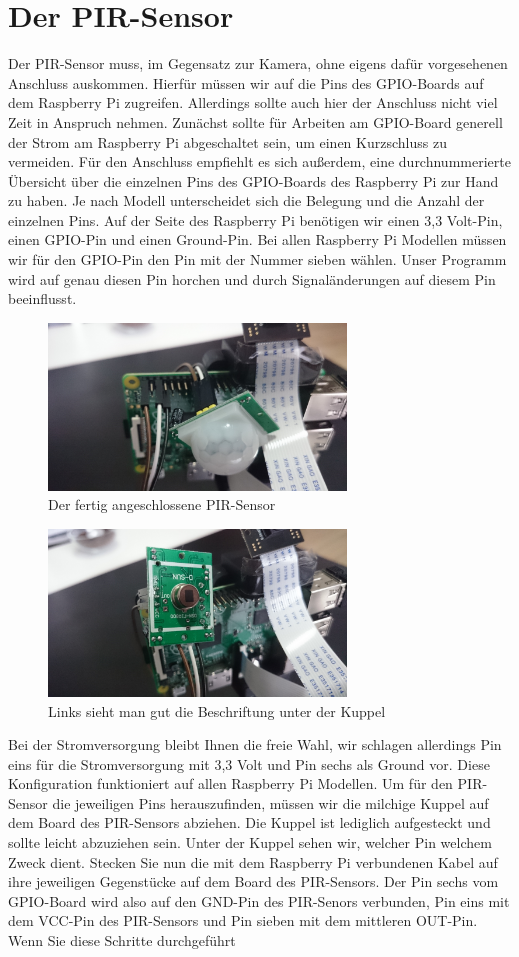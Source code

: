 \documentclass[12pt,a4paper]{scrreprt}
\begin{document}
\section{Der PIR-Sensor}
Der PIR-Sensor muss, im Gegensatz zur Kamera, ohne eigens dafür vorgesehenen Anschluss auskommen. Hierfür müssen wir auf die Pins des GPIO-Boards auf dem Raspberry Pi zugreifen. Allerdings sollte auch hier der Anschluss nicht viel Zeit in Anspruch nehmen. Zunächst sollte für Arbeiten am GPIO-Board generell der Strom am Raspberry Pi abgeschaltet sein, um einen Kurzschluss zu vermeiden. Für den Anschluss empfiehlt es sich außerdem, eine durchnummerierte Übersicht über die einzelnen Pins des GPIO-Boards des Raspberry Pi zur Hand zu haben. Je nach Modell unterscheidet sich die Belegung und die Anzahl der einzelnen Pins. Auf der Seite des Raspberry Pi benötigen wir einen 3,3 Volt-Pin, einen GPIO-Pin und einen Ground-Pin. Bei allen Raspberry Pi Modellen müssen wir für den GPIO-Pin den Pin mit der Nummer sieben wählen. Unser Programm wird auf genau diesen Pin horchen und durch Signaländerungen auf diesem Pin beeinflusst. \begin{figure}[h] \centering \includegraphics[width = 7.9cm]{pir1.JPG} \caption{Der fertig angeschlossene PIR-Sensor} \end{figure} \begin{figure}[h] \centering \includegraphics[width = 7.9cm]{pir2.JPG} \caption{Links sieht man gut die Beschriftung unter der Kuppel} \end{figure}Bei der Stromversorgung bleibt Ihnen die freie Wahl, wir schlagen allerdings Pin eins für die Stromversorgung mit 3,3 Volt und Pin sechs als Ground vor. Diese Konfiguration funktioniert auf allen Raspberry Pi Modellen. Um für den PIR-Sensor die jeweiligen Pins herauszufinden, müssen wir die milchige Kuppel auf dem Board des PIR-Sensors abziehen. Die Kuppel ist lediglich aufgesteckt und sollte leicht abzuziehen sein. Unter der Kuppel sehen wir, welcher Pin welchem Zweck dient. Stecken Sie nun die mit dem Raspberry Pi verbundenen Kabel auf ihre jeweiligen Gegenstücke auf dem Board des PIR-Sensors. Der Pin sechs vom GPIO-Board wird also auf den GND-Pin des PIR-Senors verbunden, Pin eins mit dem VCC-Pin des PIR-Sensors und Pin sieben mit dem mittleren OUT-Pin. Wenn Sie diese Schritte durchgeführt 
\end{document}
